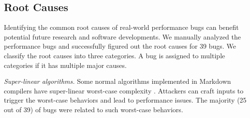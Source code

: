 \subsection{Root Causes}
\label{s:study-root-causes}
%
Identifying the common root causes of real-world performance bugs can benefit potential future research and software developments.
%
We manually analyzed the performance bugs and successfully figured out the root causes for 39 bugs.
%
We classify the root causes into three categories.
%
A bug is assigned to multiple categories if it has multiple major causes.

\iffalse
{} \emph{Super-linear algorithms.}
Some normal algorithms implemented in Markdown compilers have super-linear worst-case complexity \cite{slowfuzz, perffuzz}.
%
Attackers can craft inputs to trigger the worst-case behaviors and lead to performance issues.
%
%
The majority (25 out of 39) of bugs were related to such worst-case behaviors.
%
%
%
%
%
%
%
%
%
%
%
%
%
%

